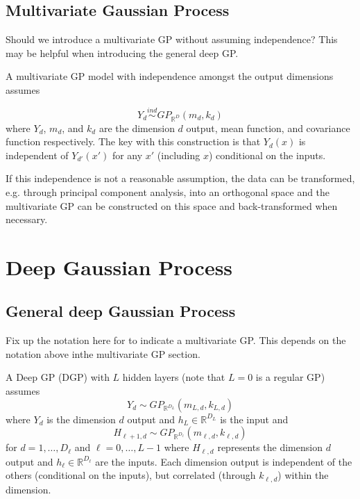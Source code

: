 \documentclass{article}
\newcommand{\jarad}[1]{{\color{red} #1}}
\newcommand{\ind}{\stackrel{ind}{\sim}}
\newcommand{\1}{\mathbbm{1}}
\begin{document}
\subsection{Multivariate Gaussian Process}

\jarad{Should we introduce a multivariate GP without assuming independence? 
This may be helpful when introducing the general deep GP.}


A multivariate GP model with independence amongst the output dimensions assumes

\[
Y_d \ind GP_{\mathbb{R}^{D}}(m_{d},k_{d})
\]
where $Y_d$, $m_d$, and $k_d$ are the dimension $d$ output, mean function,
and covariance function respectively.
The key with this construction is that $Y_d(x)$ is independent of
$Y_{d'}(x')$ for any $x'$ (including $x$) conditional on the inputs.

If this independence is not a reasonable assumption,
the data can be transformed,
e.g. through principal component analysis, into an orthogonal space and
the multivariate GP can be constructed on this space and
back-transformed when necessary.




\section{Deep Gaussian Process}
\label{sec:deepgp}


\subsection{General deep Gaussian Process}

\jarad{Fix up the notation here for to indicate a multivariate GP. 
This depends on the notation above inthe multivariate GP section.}

A Deep GP (DGP) with $L$ hidden layers 
(note that $L=0$ is a regular GP) assumes
\begin{equation}
Y_d \sim GP_{\mathbb{R}^{D_{L}}}(m_{L,d},k_{L,d})
\label{eq:y_full}
\end{equation}
where $Y_d$ is the dimension $d$ output and $h_{L} \in \mathbb{R}^{D_{L}}$ is 
the input and
\begin{equation}
H_{\ell+1,d} \sim GP_{\mathbb{R}^{D_{\ell}}}(m_{\ell,d},k_{\ell,d})
\end{equation}
for $d=1,\ldots,D_{\ell}$ and $\ell = 0,\ldots,L-1$
where $H_{\ell,d}$ represents the dimension $d$ output and
$h_{\ell} \in \mathbb{R}^{D_{\ell}}$ are the inputs.
Each dimension output is independent of the others (conditional on the inputs),
but correlated (through $k_{\ell,d}$) within the dimension.
\end{document}
